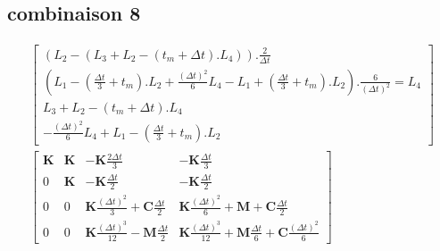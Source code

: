 \documentclass[12pt,a4paper]{report}
\begin{document}
\subsection{combinaison 8}
\begin{equation}
\begin{array}{c}
	\begin{bmatrix}	
		  \left( L_2 - (L_3 + L_2 - (t_m+\Delta t).L_4) \right)
		  	.\frac{2}{\Delta t}
		\\ \left( L_1 - \left( \frac{\Delta t}{3} + t_m \right).L_2
					+\frac{(\Delta t)^2}{6} L_4 
					- L_1 
					+ \left( \frac{\Delta t}{3} + t_m \right).L_2
			\right).\frac{6}{(\Delta t)^2}
			= L_4
		\\ L_3 + L_2 - (t_m+\Delta t).L_4
		\\ -\frac{(\Delta t)^2}{6} L_4 
			+ L_1 
			- \left( \frac{\Delta t}{3} + t_m \right).L_2
	\end{bmatrix}
	\\
		\begin{bmatrix}   
		   		\mathbf{K}
			&
		   		\mathbf{K}
		   	&
			   	-\mathbf{K} \frac{2\Delta t}{3} 
		   	&
		   		-\mathbf{K} \frac{\Delta t}{3} 
		\\ 	     
			   0 
			&
				\mathbf{K} 
		   	&
		   		-\mathbf{K} \frac{\Delta t}{2} 
		   	&
		   		-\mathbf{K} \frac{\Delta t}{2}
		\\   
		   		0
		   	& 
		   		0
		   	&
			   	\mathbf{K}
			   		\frac{(\Delta t)^2}{3} 
		   		+\mathbf{C} \frac{\Delta t}{2}
		   	&
		   		\mathbf{K} \frac{(\Delta t)^2}{6} 
		   		+\mathbf{M} 
			   	+\mathbf{C} \frac{\Delta t}{2}
		\\    
		   		0
		   	&
		   		0
		   	&
		   		\mathbf{K} \frac{(\Delta t)^3}{12}
		   		-\mathbf{M}
			   		\frac{\Delta t}{2} 
		   	&
		   		\mathbf{K} \frac{(\Delta t)^3}{12}
		   		+\mathbf{M} \frac{\Delta t}{6} 
			   +\mathbf{C} \frac{(\Delta t)^2}{6} 
	\end{bmatrix}
\end{array}
\end{equation}
\end{document}
